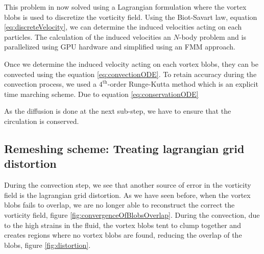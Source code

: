This problem in now solved using a Lagrangian formulation where the vortex blobs is used to discretize the vorticity field. Using the Biot-Savart law, equation \ref{eq:discreteVelocity}, we can determine the induced velocities acting on each particles. The calculation of the induced velocities an $N$-body problem and is parallelized using GPU hardware and simplified using an FMM approach.

Once we determine the induced velocity acting on each vortex blobs, they can be convected using the equation \ref{eq:convectionODE}. To retain accuracy during the convection process, we used a $4^{\mathrm{th}}$-order Runge-Kutta method which is an explicit time marching scheme. Due to equation \ref{eq:conservationODE}

As the diffusion is done at the next sub-step, we have to ensure that the circulation is conserved.


\subsection{Remeshing scheme: Treating lagrangian grid distortion}
\label{subsec:remeshing}
%

During the convection step, we see that another source of error in the vorticity field is the lagrangian grid distortion. As we have seen before, when the vortex blobs fails to overlap, we are no longer able to reconstruct the correct the vorticity field, figure \ref{fig:convergenceOfBlobsOverlap}. During the convection, due to the high strains in the fluid, the vortex blobs tent to clump together and creates regions where no vortex blobs are found, reducing the overlap of the blobs, figure \ref{fig:distortion}. 

